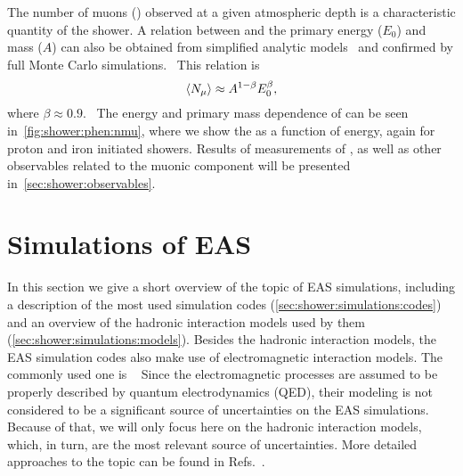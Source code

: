 
The number of muons (\nmu) observed
at a given atmospheric depth is a characteristic quantity of the shower.
A relation between \nmu and the primary energy ($E_0$) and mass ($A$)
can also be obtained from simplified analytic models~\cite{Matthews:2005sd}
and confirmed by full Monte Carlo simulations.~\cite{AlvarezMuniz:2002ne}
This relation is 
\begin{equation}
  \mbox{$\langle N_\mu\rangle$} \approx A^{1-\beta} E_0^\beta,
  \label{eq:shower:nmu}
\end{equation}
where $\beta\approx 0.9$.~\cite{AlvarezMuniz:2002ne}
The energy and primary mass dependence
of \nmumean can be seen in~\cref{fig:shower:phen:nmu},
where we show the \nmumean as a function of energy,
again for proton and iron initiated showers.
Results of measurements of \nmu, as well as other
observables related to the muonic component will be presented
in~\cref{sec:shower:observables}.


\section{Simulations of EAS}
\label{sec:shower:simulations}

In this section we give a short overview of the topic of EAS simulations,
including a description of the most used simulation codes 
(\cref{sec:shower:simulations:codes}) and
an overview of the hadronic interaction models used by them (\cref{sec:shower:simulations:models}). 
Besides the hadronic interaction models, the EAS simulation codes also
make use of electromagnetic interaction models. The commonly used one is \EGS~\cite{Nelson:1985ec}
Since the electromagnetic processes are assumed to be
properly described by quantum electrodynamics (QED),
their modeling is not considered to be a significant
source of uncertainties on the EAS simulations.
Because of that, we will only focus here on the hadronic interaction models,
which, in turn, are the most relevant source of uncertainties.
More detailed approaches to the topic can be found
in Refs.~\cite{Knapp:2002vs,Engel:2011zzb,Allen:2013ofa}.


